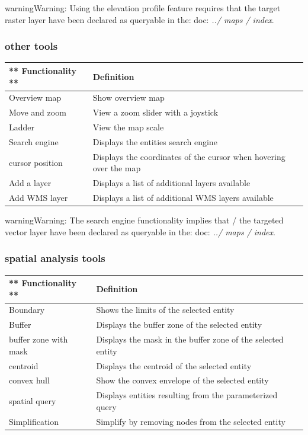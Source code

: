 \documentclass[letterpaper,10pt,english]{sphinxmanual}
\begin{document}
\begin{notice}{warning}{Warning:}
Using the elevation profile feature requires that the target raster layer have been declared as queryable in the: doc: \emph{../ maps / index}.
\end{notice}


\subsubsection{other tools}
\label{apps/appconfig:autres-outils}
\begin{tabulary}{\linewidth}{|L|L|}
\hline

** Functionality **
 & 
\textbf{Definition}
\\
\hline
Overview map
 & 
Show overview map
\\
\hline
Move and zoom
 & 
View a zoom slider with a joystick
\\
\hline
Ladder
 & 
View the map scale
\\
\hline
Search engine
 & 
Displays the entities search engine
\\
\hline
cursor position
 & 
Displays the coordinates of the cursor when hovering over the map
\\
\hline
Add a layer
 & 
Displays a list of additional layers available
\\
\hline
Add WMS layer
 & 
Displays a list of additional WMS layers available
\\
\hline\end{tabulary}


\begin{notice}{warning}{Warning:}
The search engine functionality implies that / the targeted vector layer have been declared as queryable in the: doc: \emph{../ maps / index}.
\end{notice}


\subsubsection{spatial analysis tools}
\label{apps/appconfig:outils-d-analyse-spatiale}
\begin{tabulary}{\linewidth}{|L|L|}
\hline

** Functionality **
 & 
\textbf{Definition}
\\
\hline
Boundary
 & 
Shows the limits of the selected entity
\\
\hline
Buffer
 & 
Displays the buffer zone of the selected entity
\\
\hline
buffer zone with mask
 & 
Displays the mask in the buffer zone of the selected entity
\\
\hline
centroid
 & 
Displays the centroid of the selected entity
\\
\hline
convex hull
 & 
Show the convex envelope of the selected entity
\\
\hline
spatial query
 & 
Displays entities resulting from the parameterized query
\\
\hline
Simplification
 & 
Simplify by removing nodes from the selected entity
\\
\hline\end{tabulary}
\end{document}
